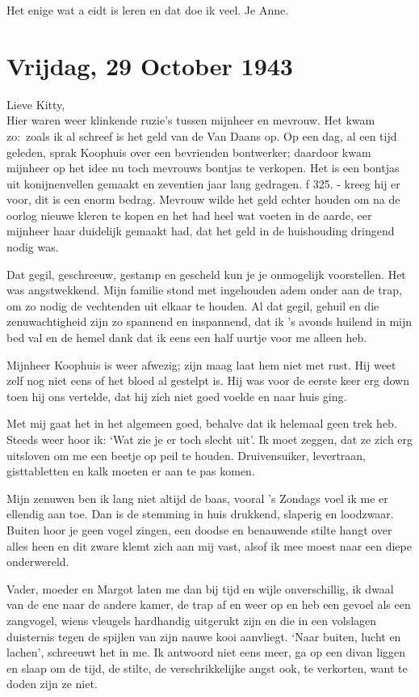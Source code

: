 \documentclass{book}
\begin{document}
Het enige wat a eidt is leren en dat doe ik veel. Je Anne.

\chapter{Vrijdag, 29 October 1943}

Lieve Kitty,\\Hier waren weer klinkende ruzie's tussen mijnheer en
mevrouw. Het kwam zo:~zoals ik al schreef is het geld van de Van Daans
op. Op een dag, al een tijd geleden, sprak Koophuis over een bevrienden
bontwerker; daardoor kwam mijnheer op het idee nu toch mevrouws bontjas
te verkopen. Het is een bontjas uit konijnenvellen gemaakt en zeventien
jaar lang gedragen. ƒ 325. - kreeg hij er voor, dit is een enorm bedrag.
Mevrouw wilde het geld echter houden om na de oorlog nieuwe kleren te
kopen en het had heel wat voeten in de aarde, eer mijnheer haar
duidelijk gemaakt had, dat het geld in de huishouding dringend nodig
was.

Dat gegil, geschreeuw, gestamp en gescheld kun je je onmogelijk
voorstellen. Het was angstwekkend. Mijn familie stond met ingehouden
adem onder aan de trap, om zo nodig de vechtenden uit elkaar te houden.
Al dat gegil, gehuil en die zenuwachtigheid zijn zo spannend en
inspannend, dat ik 's avonds huilend in mijn bed val en de hemel dank
dat ik eens een half uurtje voor me alleen heb.

Mijnheer Koophuis is weer afwezig; zijn maag laat hem niet met rust. Hij
weet zelf nog niet eens of het bloed al gestelpt is. Hij was voor de
eerste keer erg down toen hij ons vertelde, dat hij zich niet goed
voelde en naar huis ging.

Met mij gaat het in het algemeen goed, behalve dat ik helemaal geen trek
heb. Steeds weer hoor ik: `Wat zie je er toch slecht uit'. Ik moet
zeggen, dat ze zich erg uitsloven om me een beetje op peil te houden.
Druivensuiker, levertraan, gisttabletten en kalk moeten er aan te pas
komen.

Mijn zenuwen ben ik lang niet altijd de baas, vooral 's Zondags voel ik
me er ellendig aan toe. Dan is de stemming in huis drukkend, slaperig en
loodzwaar. Buiten hoor je geen vogel zingen, een doodse en benauwende
stilte hangt over alles heen en dit zware klemt zich aan mij vast, alsof
ik mee moest naar een diepe onderwereld.

Vader, moeder en Margot laten me dan bij tijd en wijle onverschillig, ik
dwaal van de ene naar de andere kamer, de trap af en weer op en heb een
gevoel als een zangvogel, wiens vleugels hardhandig uitgerukt zijn en
die in een volslagen duisternis tegen de spijlen van zijn nauwe kooi
aanvliegt. `Naar buiten, lucht en lachen', schreeuwt het in me. Ik
antwoord niet eens meer, ga op een divan liggen en slaap om de tijd, de
stilte, de verschrikkelijke angst ook, te verkorten, want te doden zijn
ze niet.
\end{document}
